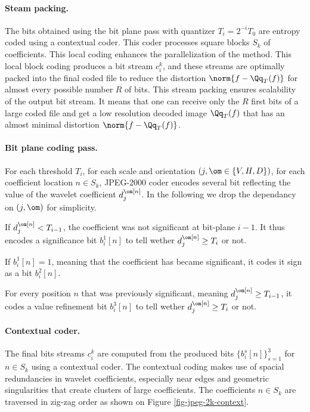 \paragraph{Steam packing.}
The bits obtained using the bit plane pass with quantizer $T_i = 2^{-i}T_0$ are entropy coded using a contextual coder. This coder processes square blocks $S_k$ of coefficients. This local coding enhances the parallelization of the method. This local block coding produces a bit stream $c_i^k$, and these streams are optimally packed into the final coded file to reduce the distortion $\norm{f-\Qq_T(f)}$ for almost every possible number $R$ of bits. This stream packing ensures scalability of the output bit stream. It means that one can receive only the $R$ first bits of a large coded file and get a low resolution decoded image $\Qq_T(f)$ that has an almost minimal distortion $\norm{f-\Qq_T(f)}$.

\paragraph{Bit plane coding pass.}

For each threshold $T_i$, for each scale and orientation $(j,\om \in \{V,H,D\})$, for each coefficient location $n \in S_k$, JPEG-2000 coder encodes several bit reflecting the value of the wavelet coefficient $d_j^\om[n]$. In the following we drop the dependancy on $(j,\om)$ for simplicity.
\begin{rs}
	\item If $d_j^\om[n] < T_{i-1}$, the coefficient was not significant at bit-plane $i-1$. It thus encodes a significance bit
		$b_i^1[n]$ to tell wether $d_j^\om[n] \geq T_{i}$ or not.
	\item If $b_i^1[n]=1$, meaning that the coefficient has became significant, it codes it sign as a bit $b_i^2[n]$.
	\item For every position $n$ that was previously significant, meaning $d_j^\om[n] \geq T_{i-1}$, it codes a value refinement bit
		 $b_i^3[n]$ to tell wether $d_j^\om[n] \geq T_{i}$ or not.
\end{rs}

\paragraph{Contextual coder.}

The final bits streams $c_i^k$ are computed from the produced bits $\{ b_i^s[n] \}_{s=1}^3$ for $n \in S_k$ using a contextual coder.
The contextual coding makes use of spacial redundancies in wavelet coefficients, especially near edges and geometric singularities that create clusters of large coefficients. The coefficients $n \in S_k$ are traversed in zig-zag order as shown on Figure \ref{fig-jpeg-2k-context}. 


